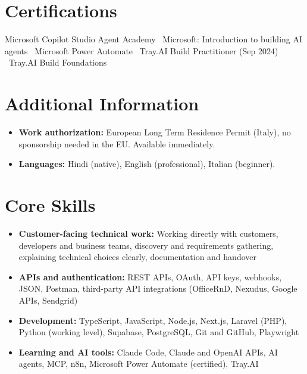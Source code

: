 \documentclass[a4paper,11pt]{article}
\begin{document}
\section{Certifications}
Microsoft Copilot Studio Agent Academy \textbullet\ Microsoft: Introduction to building AI agents \textbullet\ Microsoft Power Automate \textbullet\ Tray.AI Build Practitioner (Sep 2024) \textbullet\ Tray.AI Build Foundations

\section{Additional Information}
\begin{itemize}
 \item \textbf{Work authorization:} European Long Term Residence Permit (Italy), no sponsorship needed in the EU. Available immediately.
 \item \textbf{Languages:} Hindi (native), English (professional), Italian (beginner).
\end{itemize}

\section{Core Skills}
\begin{itemize}
 \item \textbf{Customer-facing technical work:} Working directly with customers, developers and business teams, discovery and requirements gathering, explaining technical choices clearly, documentation and handover
 \item \textbf{APIs and authentication:} REST APIs, OAuth, API keys, webhooks, JSON, Postman, third-party API integrations (OfficeRnD, Nexudus, Google APIs, Sendgrid)
 \item \textbf{Development:} TypeScript, JavaScript, Node.js, Next.js, Laravel (PHP), Python (working level), Supabase, PostgreSQL, Git and GitHub, Playwright
 \item \textbf{Learning and AI tools:} Claude Code, Claude and OpenAI APIs, AI agents, MCP, n8n, Microsoft Power Automate (certified), Tray.AI
\end{itemize}
\end{document}
